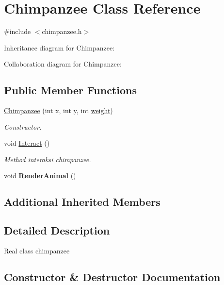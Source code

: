 \hypertarget{classChimpanzee}{}\section{Chimpanzee Class Reference}
\label{classChimpanzee}


{\ttfamily \#include $<$chimpanzee.\+h$>$}



Inheritance diagram for Chimpanzee\+:


Collaboration diagram for Chimpanzee\+:
\subsection*{Public Member Functions}
\begin{DoxyCompactItemize}
\item 
\hyperlink{classChimpanzee_ae10ec6978fa4747f20ee73fcc0e5bba8}{Chimpanzee} (int x, int y, int \hyperlink{classAnimal_a9a3b22f243f7109c57f36b3c660feb6e}{weight})
\begin{DoxyCompactList}\small\item\em Constructor. \end{DoxyCompactList}\item 
void \hyperlink{classChimpanzee_a75dd0b223dff93ca2f2e353038f267ba}{Interact} ()\hypertarget{classChimpanzee_a75dd0b223dff93ca2f2e353038f267ba}{}\label{classChimpanzee_a75dd0b223dff93ca2f2e353038f267ba}

\begin{DoxyCompactList}\small\item\em Method interaksi chimpanzee. \end{DoxyCompactList}\item 
void {\bfseries Render\+Animal} ()\hypertarget{classChimpanzee_ad83e868a78fbdf273168ab7a5b0bc4eb}{}\label{classChimpanzee_ad83e868a78fbdf273168ab7a5b0bc4eb}

\end{DoxyCompactItemize}
\subsection*{Additional Inherited Members}


\subsection{Detailed Description}
Real class chimpanzee 

\subsection{Constructor \& Destructor Documentation}
